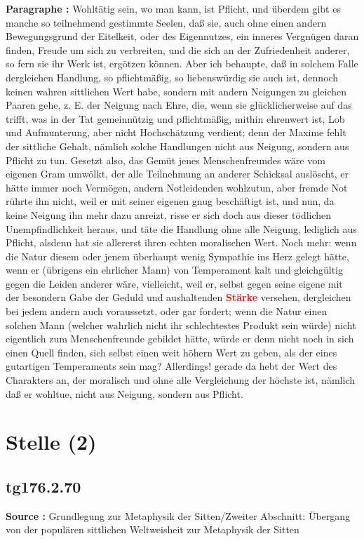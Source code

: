 \documentclass[a4paper,12pt,twoside]{book}
\newcommand{\match}[1]{\textcolor{red}{\textbf{#1}}}
\newcommand{\unnumberedsection}[1]{
	\section*{#1}
	\addcontentsline{toc}{section}{#1}
	\markright{#1}
}
\begin{document}
	\noindent\textbf{Paragraphe : }
	Wohltätig sein, wo man kann, ist Pflicht, und überdem gibt es manche so teilnehmend gestimmte Seelen, daß sie, auch ohne einen andern Bewegungsgrund der Eitelkeit, oder des Eigennutzes, ein inneres Vergnügen daran finden, Freude um sich zu verbreiten, und die sich an der Zufriedenheit anderer, so fern sie ihr Werk ist, ergötzen können. Aber ich behaupte, daß in solchem Falle dergleichen Handlung, so pflichtmäßig, so liebenswürdig sie auch ist, dennoch keinen wahren sittlichen Wert habe, sondern mit andern Neigungen zu gleichen Paaren gehe, z. E. der Neigung nach Ehre, die, wenn sie glücklicherweise auf das trifft, was in der Tat gemeinnützig und pflichtmäßig, mithin ehrenwert ist, Lob und Aufmunterung, aber nicht Hochschätzung verdient; denn der Maxime fehlt der sittliche Gehalt, nämlich solche Handlungen nicht aus Neigung, sondern aus Pflicht zu tun. Gesetzt also, das Gemüt jenes Menschenfreundes wäre vom eigenen Gram umwölkt, der alle Teilnehmung an anderer Schicksal auslöscht, er hätte immer noch Vermögen, andern Notleidenden wohlzutun, aber fremde Not rührte ihn nicht, weil er mit seiner eigenen gnug beschäftigt ist, und nun, da keine Neigung ihn mehr dazu anreizt, risse er sich doch aus dieser tödlichen Unempfindlichkeit heraus, und täte die Handlung ohne alle Neigung, lediglich aus Pflicht, alsdenn hat sie allererst ihren echten moralischen Wert. Noch mehr: wenn die Natur diesem oder jenem überhaupt wenig Sympathie ins Herz gelegt hätte, wenn er (übrigens ein ehrlicher Mann) von Temperament kalt und gleichgültig gegen die Leiden anderer wäre, vielleicht, weil er, selbst gegen seine eigene mit der besondern Gabe der Geduld und aushaltenden \match{Stärke} versehen, dergleichen bei jedem andern auch voraussetzt, oder gar fordert; wenn die Natur einen solchen Mann (welcher wahrlich nicht ihr schlechtestes Produkt sein würde) nicht eigentlich zum Menschenfreunde gebildet hätte, würde er denn nicht noch in sich einen Quell finden, sich selbst einen weit höhern Wert zu geben, als der eines gutartigen Temperaments sein mag? Allerdings! gerade da hebt der Wert des Charakters an, der  moralisch und ohne alle Vergleichung der höchste ist, nämlich daß er wohltue, nicht aus Neigung, sondern aus Pflicht. 
	
	\unnumberedsection{Stelle (2)} 
	\subsection*{tg176.2.70} 
	\textbf{Source : }Grundlegung zur Metaphysik der Sitten/Zweiter Abschnitt: Übergang von der populären sittlichen Weltweisheit zur Metaphysik der Sitten\\  
	
\end{document}
